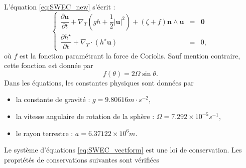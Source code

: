 L'équation \eqref{eq:SWEC_new} s'écrit :
\begin{equation}
\label{eq:SWEC_vectform}
\left\lbrace
\begin{array}{rcl}
\dfrac{\partial \mathbf{u}}{\partial t} + \nabla_T \left( g h + \dfrac{1}{2} |\mathbf{u}|^2  \right) + \left( \zeta + f \right) \mathbf{n} \wedge \mathbf{u} & = & \mathbf{0} \\
\dfrac{\partial h^{\star}}{\partial t} + \nabla_T \cdot \left( h^{\star} \mathbf{u} \right) & = & 0,
\end{array}
\right.
\end{equation}
où $f$ est la fonction paramétrant la force de Coriolis. Sauf mention contraire, cette fonction est donnée par
\begin{equation}
f(\theta) = 2 \Omega \sin \theta.
\end{equation}
Dans les équations, les constantes physiques sont données par
\begin{itemize}
\item la constante de gravité : $g=9.80616 m \cdot \si{s^{-2}}$,
\item la vitesse angulaire de rotation de la sphère : $\Omega=7.292 \times 10^{-5} \si{s^{-1}}$,
\item le rayon terrestre : $a=6.37122 \times 10^6 \si{m}$.
\end{itemize}

Le système d'équations \eqref{eq:SWEC_vectform} est une loi de conservation. Les propriétés de conservations suivantes sont vérifiées

